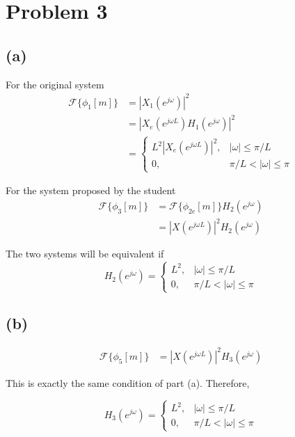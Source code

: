 \documentclass{article}
\begin{document}
\section{Problem 3}

\subsection{(a)}
For the original system
\begin{align} \nonumber
\mathcal{F}\{\phi_1[m]\} &= |X_1(e^{j\omega})|^2 \\ \nonumber
&= |X_e(e^{j\omega L})H_1(e^{j\omega})|^2 \\ 
& = \begin{cases}
L^2|X_e(e^{j\omega L})|^2, & |\omega| \leq \pi/L \\
0, & \pi/L < |\omega| \leq \pi
\end{cases} 
\end{align}

For the system proposed by the student
\begin{align} \nonumber
\mathcal{F}\{\phi_3[m]\} &= \mathcal{F}\{\phi_{2e}[m]\} H_2(e^{j\omega}) \\
&= |X(e^{j\omega L})|^2H_2(e^{j\omega})
\end{align}

The two systems will be equivalent if
\begin{equation}
H_2(e^{j\omega}) = \begin{cases}
L^2, & |\omega| \leq \pi/L \\
0, & \pi/L < |\omega| \leq \pi
\end{cases}
\end{equation}

\subsection{(b)}

\begin{align} \nonumber
\mathcal{F}\{\phi_5[m]\} &= |X(e^{j\omega L})|^2 H_3(e^{j\omega})
\end{align}

This is exactly the same condition of part (a). Therefore, 

\begin{equation}
H_3(e^{j\omega}) = \begin{cases}
L^2, & |\omega| \leq \pi/L \\
0, & \pi/L < |\omega| \leq \pi
\end{cases}
\end{equation}
\end{document}
